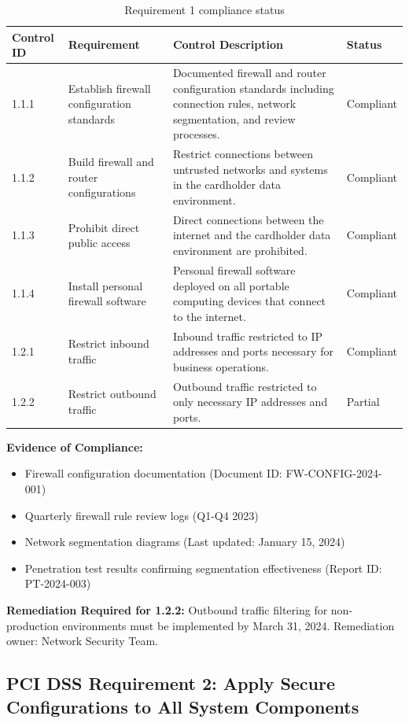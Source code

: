 \documentclass[
    language=english,
    doctype=compliance-document,
    institution=none,
]{../../omnilatex}
\begin{document}
\begin{table}[h]
\centering
\small
\begin{tabular}{p{3cm}p{5cm}p{4cm}p{3cm}}
\toprule
\textbf{Control ID} & \textbf{Requirement} & \textbf{Control Description} & \textbf{Status} \\
\midrule
1.1.1 & Establish firewall configuration standards & Documented firewall and router configuration standards including connection rules, network segmentation, and review processes. & Compliant \\
1.1.2 & Build firewall and router configurations & Restrict connections between untrusted networks and systems in the cardholder data environment. & Compliant \\
1.1.3 & Prohibit direct public access & Direct connections between the internet and the cardholder data environment are prohibited. & Compliant \\
1.1.4 & Install personal firewall software & Personal firewall software deployed on all portable computing devices that connect to the internet. & Compliant \\
1.2.1 & Restrict inbound traffic & Inbound traffic restricted to IP addresses and ports necessary for business operations. & Compliant \\
1.2.2 & Restrict outbound traffic & Outbound traffic restricted to only necessary IP addresses and ports. & Partial \\
\bottomrule
\end{tabular}
\caption{Requirement 1 compliance status}
\end{table}

\textbf{Evidence of Compliance:}
\begin{itemize}
    \item Firewall configuration documentation (Document ID: FW-CONFIG-2024-001)
    \item Quarterly firewall rule review logs (Q1-Q4 2023)
    \item Network segmentation diagrams (Last updated: January 15, 2024)
    \item Penetration test results confirming segmentation effectiveness (Report ID: PT-2024-003)
\end{itemize}

\textbf{Remediation Required for 1.2.2:} Outbound traffic filtering for non-production environments must be implemented by March 31, 2024. Remediation owner: Network Security Team.

\subsection{PCI DSS Requirement 2: Apply Secure Configurations to All System Components}
\end{document}
